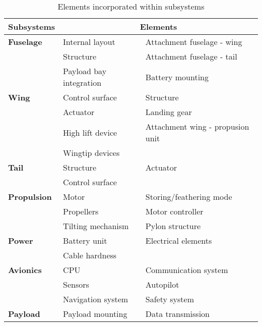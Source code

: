 \begin{table}[]
\centering
\caption{Elements incorporated within subsystems}
\label{my-label}
\begin{tabular}{l|ll}
\hline
\textbf{Subsystems}     & \multicolumn{2}{c}{\textbf{Elements}}                               \\\hline
\textbf{Fuselage}       & Internal layout            & Attachment fuselage - wing   \\
\textbf{}               & Structure                  & Attachment fuselage - tail   \\
\textbf{}               & Payload bay integration    & Battery mounting              \\\hdashline
\textbf{Wing}           & Control surface            & Structure                     \\
\textbf{}               & Actuator                   & Landing gear                  \\
\textbf{}               & High lift device           & Attachment wing - propusion unit \\
                        & Wingtip devices            &                               \\\hdashline
\textbf{Tail}           & Structure                  & Actuator                      \\
\textbf{}               & Control surface            &                               \\\hdashline
\textbf{Propulsion}     & Motor                      & Storing/feathering mode       \\
\textbf{}               & Propellers                 & Motor controller              \\
\textbf{}               & Tilting mechanism          & Pylon structure               \\\hdashline
\textbf{Power}          & Battery unit               & Electrical elements           \\
\textbf{}               & Cable hardness             &                               \\\hdashline
\textbf{Avionics}       & CPU                        & Communication system          \\
\textbf{}               & Sensors                    & Autopilot                     \\
\textbf{}               & Navigation system          & Safety system                 \\\hdashline
\textbf{Payload}        & Payload mounting           & Data transmission             \\

\end{tabular}
\end{table}
